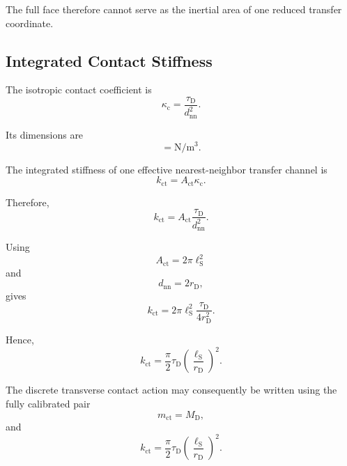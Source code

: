 The full face therefore cannot serve as the inertial area of one reduced transfer coordinate.

\subsection{Integrated Contact Stiffness}

The isotropic contact coefficient is
\begin{equation}
    \kappa_{\mathrm{c}} = \frac{\tau_{\mathrm{D}}}{d_{\mathrm{nn}}^2}.
\end{equation}

Its dimensions are
\begin{equation}
    [\kappa_{\mathrm{c}}] = \mathrm{N/m^3}.
\end{equation}

The integrated stiffness of one effective nearest-neighbor transfer channel is
\begin{equation}
    k_{\mathrm{ct}} = A_{\mathrm{ct}}\kappa_{\mathrm{c}}.
\end{equation}

Therefore,
\begin{equation}
    k_{\mathrm{ct}} = A_{\mathrm{ct}} \frac{\tau_{\mathrm{D}}}{d_{\mathrm{nn}}^2}.
\end{equation}

Using
\begin{equation}
    A_{\mathrm{ct}} = 2\pi\ell_{\mathrm{S}}^2
\end{equation}
and
\begin{equation}
    d_{\mathrm{nn}} = 2r_{\mathrm{D}},
\end{equation}
gives
\begin{equation}
    k_{\mathrm{ct}} = 2\pi\ell_{\mathrm{S}}^2 \frac{\tau_{\mathrm{D}}}{4r_{\mathrm{D}}^2}.
\end{equation}

Hence,
\begin{equation}
    \boxed{ k_{\mathrm{ct}} = \frac{\pi}{2} \tau_{\mathrm{D}} \left( \frac{\ell_{\mathrm{S}}}{r_{\mathrm{D}}} \right)^2 }.
\end{equation}

The discrete transverse contact action may consequently be written using the fully calibrated pair
\begin{equation}
    \boxed{ m_{\mathrm{ct}} = M_{\mathrm{D}} },
\end{equation}
and
\begin{equation}
    \boxed{ k_{\mathrm{ct}} = \frac{\pi}{2} \tau_{\mathrm{D}} \left( \frac{\ell_{\mathrm{S}}}{r_{\mathrm{D}}} \right)^2 }.
\end{equation}

